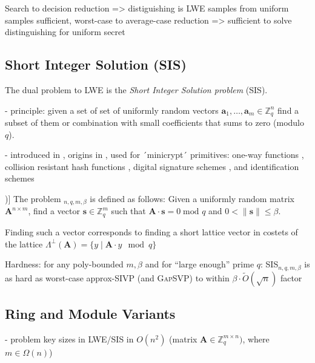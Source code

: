 \documentclass[
  a4paper,  %
  twoside,  %
  bibliography=totoc,
  headsepline,
  cleardoublepage=empty,
  parskip=half,
  draft=false
]{scrbook}
\begin{document}
Search to decision reduction => distiguishing is LWE samples from uniform samples sufficient, worst-case to average-case reduction => sufficient to solve distinguishing for uniform secret

\subsection{Short Integer Solution (SIS)}
The dual problem to LWE is the \textit{Short Integer Solution problem} (SIS).

- principle: given a set of set of uniformly random vectors $\mathbf{a}_1, \ldots, \mathbf{a}_m \in \mathbb{Z}_q^n$ find a subset of them or combination with small coefficients that sums to zero (modulo $q$). %

- introduced in \cite{MR04}, origins in \cite{Ajt96}, used for ´minicrypt´ primitives: one-way functions \cite{Ajt96}, collision resistant hash functions \cite{GGH96}, digital signature schemes \cite{GPV08, CHKP10}, and identification schemes \cite{MV03, Lyu08, KTX07} %

\begin{definition}[SIS Problem (Adapted from [\citealp{LS15}, Definition 3.1])]
  The problem $_{n, q, m, \beta}$ is defined as follows: Given a uniformly random matrix $\mathbf{A}^{n\times m}$, find a vector $\mathbf{s} \in \mathbb{Z}_q^m$ such that $\mathbf{A} \cdot \mathbf{s} = 0 \; \text{mod } q$ and $0 < \| \mathbf{s}\| \leq \beta$.
\end{definition}

Finding such a vector corresponds to finding a short lattice vector in costets of the lattice $\Lambda^{\perp}(\mathbf{A}) = \{ y \mid \mathbf{A} \cdot y \mod q \}$ %

Hardness: for any poly-bounded $m, \beta$ and for ``large enough'' prime $q$: SIS$_{n, q, m, \beta}$ is as hard as worst-case approx-SIVP (and \textsc{GapSVP}) to within $\beta \cdot \tilde{O}(\sqrt{n})$ factor



\subsection{Ring and Module Variants}
- problem key sizes in LWE/SIS in $O(n^2)$ (matrix $\mathbf{A} \in \mathbb{Z}_q^{m \times n})$, where $m \in \Omega(n)$)%
\end{document}
